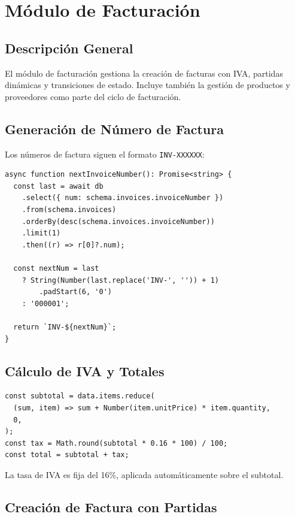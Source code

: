 \chapter{M\'odulo de Facturaci\'on}

\section{Descripci\'on General}

El m\'odulo de facturaci\'on gestiona la creaci\'on de facturas con IVA,
partidas din\'amicas y transiciones de estado. Incluye tambi\'en la gesti\'on
de productos y proveedores como parte del ciclo de facturaci\'on.

\section{Generaci\'on de N\'umero de Factura}

Los n\'umeros de factura siguen el formato \texttt{INV-XXXXXX}:

\begin{lstlisting}[style=typescript, caption=Generacion secuencial de numero de factura]
async function nextInvoiceNumber(): Promise<string> {
  const last = await db
    .select({ num: schema.invoices.invoiceNumber })
    .from(schema.invoices)
    .orderBy(desc(schema.invoices.invoiceNumber))
    .limit(1)
    .then((r) => r[0]?.num);

  const nextNum = last
    ? String(Number(last.replace('INV-', '')) + 1)
        .padStart(6, '0')
    : '000001';

  return `INV-${nextNum}`;
}
\end{lstlisting}

\section{C\'alculo de IVA y Totales}

\begin{lstlisting}[style=typescript, caption={Calculo de subtotal, IVA 16\% y total}]
const subtotal = data.items.reduce(
  (sum, item) => sum + Number(item.unitPrice) * item.quantity,
  0,
);
const tax = Math.round(subtotal * 0.16 * 100) / 100;
const total = subtotal + tax;
\end{lstlisting}

La tasa de IVA es fija del 16\%, aplicada autom\'aticamente sobre el subtotal.

\section{Creaci\'on de Factura con Partidas}

